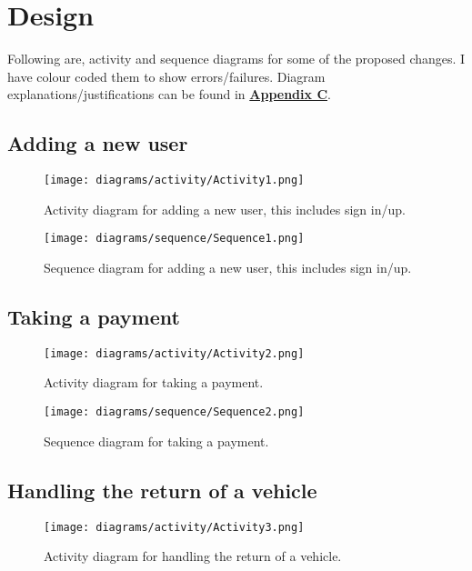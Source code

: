 \section{Design}
  Following are, activity and sequence diagrams for some of the proposed changes. I have colour coded them to show
  errors/failures. Diagram explanations/justifications can be found in \hyperref[sec:AppendixC]{\textbf{Appendix C}}.

  \subsection{Adding a new user}

    \begin{figure}[H]
      \centering
      \texttt{[image: diagrams/activity/Activity1.png]}
      \caption{Activity diagram for adding a new user, this includes sign in/up.}
      \label{fig:newUserActivity}
    \end{figure}

    \begin{figure}[H]
      \centering
      \texttt{[image: diagrams/sequence/Sequence1.png]}
      \caption{Sequence diagram for adding a new user, this includes sign in/up.}
      \label{fig:newUserSequence}
    \end{figure}
  
  \newpage
  
  \subsection{Taking a payment}
  \label{sec:design:payment}
  
    \begin{figure}[H]
      \centering
      \texttt{[image: diagrams/activity/Activity2.png]}
      \caption{Activity diagram for taking a payment.}
      \label{fig:takePaymentActivity}
    \end{figure}

    \begin{figure}[H]
      \centering
      \texttt{[image: diagrams/sequence/Sequence2.png]}
      \caption{Sequence diagram for taking a payment.}
      \label{fig:takePaymentSequence}
    \end{figure}

  \newpage

  \subsection{Handling the return of a vehicle}
    \begin{figure}[H]
      \centering
      \texttt{[image: diagrams/activity/Activity3.png]}
      \caption{Activity diagram for handling the return of a vehicle.}
      \label{fig:vehicleReturnActivity}
    \end{figure}

